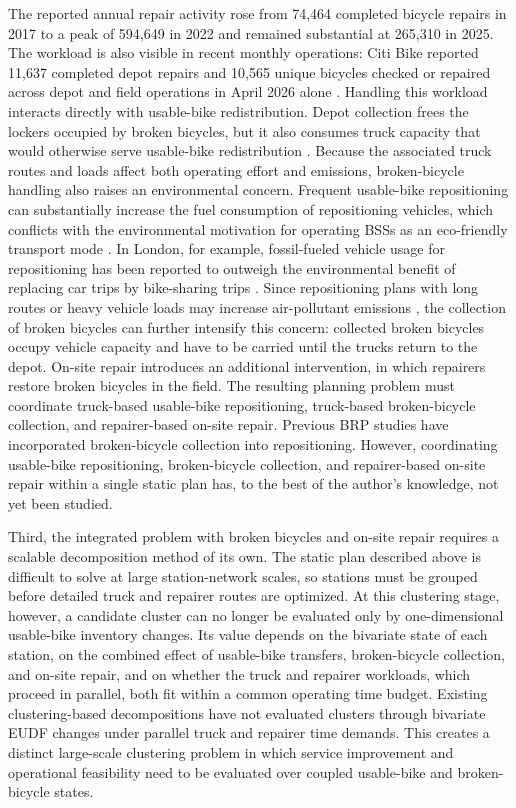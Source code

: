 The reported annual repair activity rose from 74,464 completed bicycle repairs in 2017 to a peak of 594,649 in 2022 and remained substantial at 265,310 in 2025. The workload is also visible in recent monthly operations: Citi Bike reported 11,637 completed depot repairs and 10,565 unique bicycles checked or repaired across depot and field operations in April 2026 alone \citep{citibikeAprilMonthlyReport2026}. Handling this workload interacts directly with usable-bike redistribution. Depot collection frees the lockers occupied by broken bicycles, but it also consumes truck capacity that would otherwise serve usable-bike redistribution \citep{wangStaticGreenRepositioning2018}. Because the associated truck routes and loads affect both operating effort and emissions, broken-bicycle handling also raises an environmental concern. Frequent usable-bike repositioning can substantially increase the fuel consumption of repositioning vehicles, which conflicts with the environmental motivation for operating BSSs as an eco-friendly transport mode \citep{luo2019comparativelife}. In London, for example, fossil-fueled vehicle usage for repositioning has been reported to outweigh the environmental benefit of replacing car trips by bike-sharing trips \citep{fishmanBikeSharesImpact2014}. Since repositioning plans with long routes or heavy vehicle loads may increase air-pollutant emissions \citep{shuiDynamicGreenBike2018}, the collection of broken bicycles can further intensify this concern: collected broken bicycles occupy vehicle capacity and have to be carried until the trucks return to the depot. On-site repair introduces an additional intervention, in which repairers restore broken bicycles in the field. The resulting planning problem must coordinate truck-based usable-bike repositioning, truck-based broken-bicycle collection, and repairer-based on-site repair. Previous BRP studies have incorporated broken-bicycle collection into repositioning. However, coordinating usable-bike repositioning, broken-bicycle collection, and repairer-based on-site repair within a single static plan has, to the best of the author's knowledge, not yet been studied.

Third, the integrated problem with broken bicycles and on-site repair requires a scalable decomposition method of its own. The static plan described above is difficult to solve at large station-network scales, so stations must be grouped before detailed truck and repairer routes are optimized. At this clustering stage, however, a candidate cluster can no longer be evaluated only by one-dimensional usable-bike inventory changes. Its value depends on the bivariate state of each station, on the combined effect of usable-bike transfers, broken-bicycle collection, and on-site repair, and on whether the truck and repairer workloads, which proceed in parallel, both fit within a common operating time budget. Existing clustering-based decompositions have not evaluated clusters through bivariate EUDF changes under parallel truck and repairer time demands. This creates a distinct large-scale clustering problem in which service improvement and operational feasibility need to be evaluated over coupled usable-bike and broken-bicycle states.

